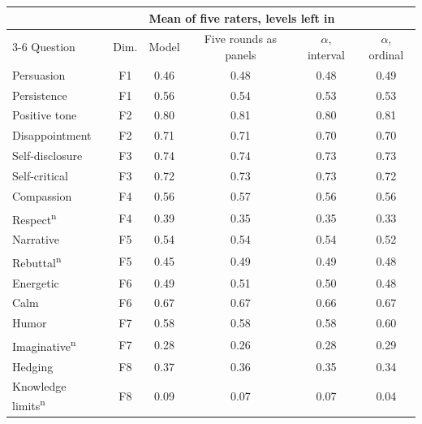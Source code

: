{\footnotesize
\begin{tabular}{@{}l c cccc@{}}
\toprule
 & & \multicolumn{4}{l}{Mean of five raters, levels left in} \\
\cmidrule{3-6}
Question & Dim. & Model & Five rounds as panels & $\alpha$, interval & $\alpha$, ordinal \\
\midrule
Persuasion & F1 & 0.46 & 0.48 & 0.48 & 0.49 \\
Persistence & F1 & 0.56 & 0.54 & 0.53 & 0.53 \\
Positive tone & F2 & 0.80 & 0.81 & 0.80 & 0.81 \\
Disappointment & F2 & 0.71 & 0.71 & 0.70 & 0.70 \\
Self-disclosure & F3 & 0.74 & 0.74 & 0.73 & 0.73 \\
Self-critical & F3 & 0.72 & 0.73 & 0.73 & 0.72 \\
Compassion & F4 & 0.56 & 0.57 & 0.56 & 0.56 \\
Respect\textsuperscript{n} & F4 & 0.39 & 0.35 & 0.35 & 0.33 \\
Narrative & F5 & 0.54 & 0.54 & 0.54 & 0.52 \\
Rebuttal\textsuperscript{n} & F5 & 0.45 & 0.49 & 0.49 & 0.48 \\
Energetic & F6 & 0.49 & 0.51 & 0.50 & 0.48 \\
Calm & F6 & 0.67 & 0.67 & 0.66 & 0.67 \\
Humor & F7 & 0.58 & 0.58 & 0.58 & 0.60 \\
Imaginative\textsuperscript{n} & F7 & 0.28 & 0.26 & 0.28 & 0.29 \\
Hedging & F8 & 0.37 & 0.36 & 0.35 & 0.34 \\
Knowledge limits\textsuperscript{n} & F8 & 0.09 & 0.07 & 0.07 & 0.04 \\
\bottomrule
\end{tabular}}
